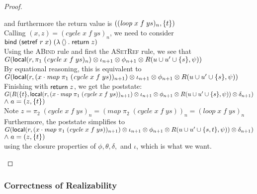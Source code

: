 \begin{proof}
\begin{tabbedproof}
\oo and furthermore the return value is $((\mathit{loop}\;x\;f\;ys)_n, \{{t}\})$ \\
\oo Calling $(x, z) = (\mathit{cycle}\;x\;f\;ys)_n$, we need to consider $\mathsf{bind}\; (\mathsf{setref}\; r\;x)\; (\lambda \left<\right>.\;\mathsf{return}\; z)$ \\
\oo Using the \textsc{ABind} rule and first the \textsc{ASetRef} rule, we see that \\
\oo $G(\mathsf{local}({r}, {\pi_1\;(\mathit{cycle}\;x\;f\;ys)_n}) \otimes \iota_{n+1} \otimes \phi_{n+1} \otimes R(u \cup u' \cup \{{s}\}, \psi))$\\
\oo By equational reasoning, this is equivalent to \\
\oo $G(\mathsf{local}({r}, {(x \cdot \mathit{map}\;\pi_1\;(\mathit{cycle}\;x\;f\;ys))_{n+1}}) \otimes \iota_{n+1} \otimes \phi_{n+1} \otimes R(u \cup u' \cup \{{s}\}, \psi))$\\
\oo Finishing with $\mathsf{return}\; z$, we get the poststate: \\
\oo $G(R(\{{t}\}, \mathsf{local}({r}, {(x \cdot \mathit{map}\;\pi_1\;(\mathit{cycle}\;x\;f\;ys))_{n+1}}) \otimes \iota_{n+1} \otimes \phi_{n+1} \otimes R(u \cup u' \cup \{{s}\}, \psi)) \otimes \delta_{n+1})$\\
\oox $\land\; a = (z, \{{t}\})$\\
\oo Note $z = \pi_2\;(\mathit{cycle}\;x\;f\;ys)_n = (\mathit{map}\;\pi_2\;(\mathit{cycle}\;x\;f\;ys))_n = (\mathit{loop}\;x\;f\;ys)_n$ \\
\oo Furthermore, the poststate simplifies to \\
\oo $G(\mathsf{local}({r}, {(x \cdot \mathit{map}\;\pi_1\;(\mathit{cycle}\;x\;f\;ys))_{n+1}}) \otimes \iota_{n+1} \otimes \phi_{n+1} \otimes R(u \cup u' \cup \{{s,t}\}, \psi)) \otimes \delta_{n+1})$ \\
\oox $\land\; a = (z, \{{t}\})$\\
\oo using the closure properties of $\phi, \theta, \delta,$ and $\iota$, which is what we want.
\end{tabbedproof}
\end{proof}

\subsubsection{Correctness of Realizability}

